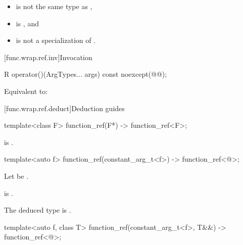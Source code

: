 \begin{itemdescr}
\pnum
\constraints
\begin{itemize}
\item {} is not the same type as ,
\item {} is , and
\item {} is not a specialization of .
\end{itemize}
\end{itemdescr}

[func.wrap.ref.inv]{Invocation}

%
\begin{itemdecl}
R operator()(ArgTypes... args) const noexcept(@@);
\end{itemdecl}

\begin{itemdescr}
\pnum
\effects
Equivalent to:
\end{itemdescr}

[func.wrap.ref.deduct]{Deduction guides}

\begin{itemdecl}
template<class F>
  function_ref(F*) -> function_ref<F>;
\end{itemdecl}

\begin{itemdescr}
\pnum
\constraints
{} is .
\end{itemdescr}

\begin{itemdecl}
template<auto f>
  function_ref(constant_arg_t<f>) -> function_ref<@\seebelow@>;
\end{itemdecl}

\begin{itemdescr}
\pnum
Let  be .

\pnum
\constraints
{} is .

\pnum
\remarks
The deduced type is .
\end{itemdescr}

\begin{itemdecl}
template<auto f, class T>
  function_ref(constant_arg_t<f>, T&&) -> function_ref<@\seebelow@>;
\end{itemdecl}

